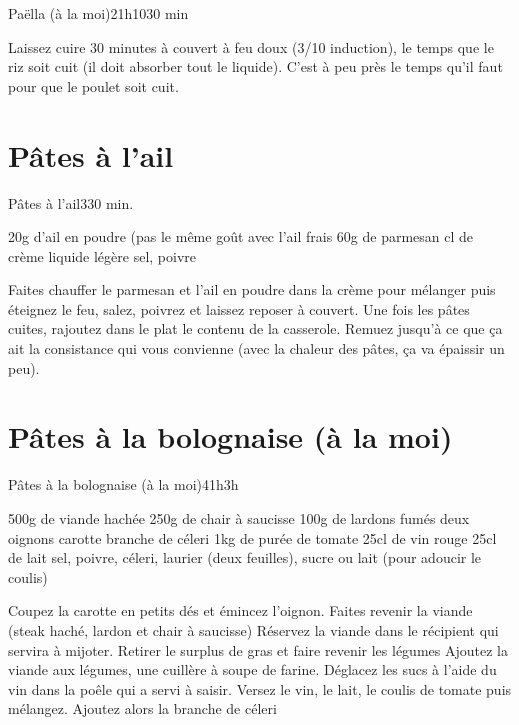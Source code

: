 {\begin{recette}{Paëlla (à la moi)}{2}{1h10}{30 min}
\begin{cuisson}
Laissez cuire 30 minutes à couvert à feu doux (3/10 induction), le temps que le riz soit cuit (il doit absorber tout le liquide). 
C'est à peu près le temps qu'il faut pour que le poulet soit cuit. 
\end{cuisson}
\end{recette}

\section{Pâtes à l'ail}
\begin{recette}{Pâtes à l'ail}{3}{30 min.}{}
\begin{ingredients}
\ingredient 20g d'ail en poudre (pas le même  goût avec l'ail frais
\ingredient 60g de parmesan
 cl de crème liquide légère 
\ingredient sel, poivre
\end{ingredients}


\begin{preparation}
\etape Faites chauffer le parmesan et l'ail en poudre dans la crème pour mélanger puis éteignez le feu, salez, poivrez et laissez reposer à couvert.
\etape Une fois les pâtes cuites, rajoutez dans le plat le contenu de la casserole. Remuez jusqu'à ce que ça ait la consistance qui vous convienne (avec la chaleur des pâtes, ça va épaissir un peu).
\end{preparation}
\end{recette}

\section{Pâtes à la bolognaise (à la moi)}
\begin{recette}{Pâtes à la bolognaise (à la moi)}{4}{1h}{3h}
\begin{ingredients}
\ingredient 500g de viande hachée
\ingredient 250g de chair à saucisse
\ingredient 100g de lardons fumés
\ingredient deux oignons
 carotte
 branche de céleri
\ingredient 1kg de purée de tomate
\ingredient 25cl de vin rouge
\ingredient 25cl de lait
\ingredient sel, poivre, céleri, laurier (deux feuilles), sucre ou lait (pour adoucir le coulis)
\end{ingredients}

\begin{preparation}
\etape Coupez la carotte en petits dés et émincez l'oignon.
\etape Faites revenir la viande (steak haché, lardon et chair à saucisse)
\etape Réservez la viande dans le récipient qui servira à mijoter. 
\etape Retirer le surplus de gras et faire revenir les légumes
\etape Ajoutez la viande aux légumes, une cuillère à soupe de farine.
\etape Déglacez les sucs à l'aide du vin dans la poêle qui a servi à saisir. 
\etape Versez le vin, le lait, le coulis de tomate puis mélangez. Ajoutez alors la branche de céleri
\end{preparation}



\end{recette}}

